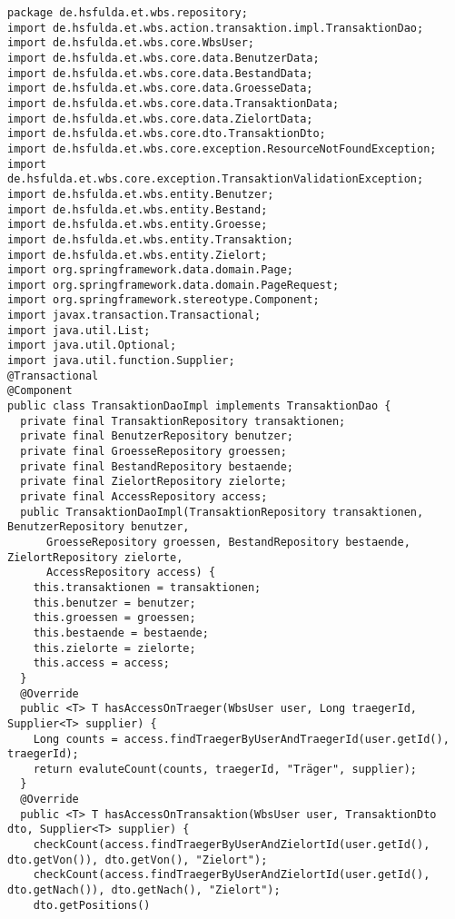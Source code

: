 \begin{lstlisting}[caption={Implementierung der Schnittstelle \code{TransaktionsDao} auf Seite von \code{repository}.}, label={lst:n_TransaktionDaoImpl}]
package de.hsfulda.et.wbs.repository;
import de.hsfulda.et.wbs.action.transaktion.impl.TransaktionDao;
import de.hsfulda.et.wbs.core.WbsUser;
import de.hsfulda.et.wbs.core.data.BenutzerData;
import de.hsfulda.et.wbs.core.data.BestandData;
import de.hsfulda.et.wbs.core.data.GroesseData;
import de.hsfulda.et.wbs.core.data.TransaktionData;
import de.hsfulda.et.wbs.core.data.ZielortData;
import de.hsfulda.et.wbs.core.dto.TransaktionDto;
import de.hsfulda.et.wbs.core.exception.ResourceNotFoundException;
import de.hsfulda.et.wbs.core.exception.TransaktionValidationException;
import de.hsfulda.et.wbs.entity.Benutzer;
import de.hsfulda.et.wbs.entity.Bestand;
import de.hsfulda.et.wbs.entity.Groesse;
import de.hsfulda.et.wbs.entity.Transaktion;
import de.hsfulda.et.wbs.entity.Zielort;
import org.springframework.data.domain.Page;
import org.springframework.data.domain.PageRequest;
import org.springframework.stereotype.Component;
import javax.transaction.Transactional;
import java.util.List;
import java.util.Optional;
import java.util.function.Supplier;
@Transactional
@Component
public class TransaktionDaoImpl implements TransaktionDao {
  private final TransaktionRepository transaktionen;
  private final BenutzerRepository benutzer;
  private final GroesseRepository groessen;
  private final BestandRepository bestaende;
  private final ZielortRepository zielorte;
  private final AccessRepository access;
  public TransaktionDaoImpl(TransaktionRepository transaktionen, BenutzerRepository benutzer,
      GroesseRepository groessen, BestandRepository bestaende, ZielortRepository zielorte,
      AccessRepository access) {
    this.transaktionen = transaktionen;
    this.benutzer = benutzer;
    this.groessen = groessen;
    this.bestaende = bestaende;
    this.zielorte = zielorte;
    this.access = access;
  }
  @Override
  public <T> T hasAccessOnTraeger(WbsUser user, Long traegerId, Supplier<T> supplier) {
    Long counts = access.findTraegerByUserAndTraegerId(user.getId(), traegerId);
    return evaluteCount(counts, traegerId, "Träger", supplier);
  }
  @Override
  public <T> T hasAccessOnTransaktion(WbsUser user, TransaktionDto dto, Supplier<T> supplier) {
    checkCount(access.findTraegerByUserAndZielortId(user.getId(), dto.getVon()), dto.getVon(), "Zielort");
    checkCount(access.findTraegerByUserAndZielortId(user.getId(), dto.getNach()), dto.getNach(), "Zielort");
    dto.getPositions()

\end{lstlisting}
